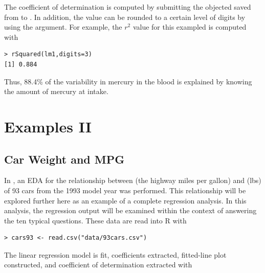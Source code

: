 \documentclass[10pt,openany]{book}\usepackage[]{graphicx}\usepackage[]{color}
\makeatletter
\newenvironment{kframe}{%
 \def\at@end@of@kframe{}%
 \ifinner\ifhmode%
  \def\at@end@of@kframe{\end{minipage}}%
  \begin{minipage}{\columnwidth}%
 \fi\fi%
 \def\FrameCommand##1{\hskip\@totalleftmargin \hskip-\fboxsep
 \colorbox{shadecolor}{##1}\hskip-\fboxsep
     \hskip-\linewidth \hskip-\@totalleftmargin \hskip\columnwidth}%
 \MakeFramed {\advance\hsize-\width
   \@totalleftmargin\z@ \linewidth\hsize
   \@setminipage}}%
 {\par\unskip\endMakeFramed%
 \at@end@of@kframe}
\newenvironment{knitrout}{}{} %
\makeatother
\begin{document}

The coefficient of determination is computed by submitting the objected saved from  to .  In addition, the value can be rounded to a certain level of digits by using the  argument.  For example, the $r^{2}$ value for this exampled is computed with
\begin{knitrout}
\color{fgcolor}\begin{kframe}
\begin{verbatim}
> rSquared(lm1,digits=3)
[1] 0.884
\end{verbatim}
\end{kframe}
\end{knitrout}
Thus, 88.4\% of the variability in mercury in the blood is explained by knowing the amount of mercury at intake.


\section{Examples II}
\subsection*{Car Weight and MPG}
In , an EDA for the relationship between  (the highway miles per gallon) and  (lbs) of 93 cars from the 1993 model year was performed.  This relationship will be explored further here as an example of a complete regression analysis.  In this analysis, the regression output will be examined within the context of answering the ten typical questions.  These data are read into R with
\begin{knitrout}
\color{fgcolor}\begin{kframe}
\begin{verbatim}
> cars93 <- read.csv("data/93cars.csv")
\end{verbatim}
\end{kframe}
\end{knitrout}
The linear regression model is fit, coefficients extracted, fitted-line plot constructed, and coefficient of determination extracted with
\end{document}
